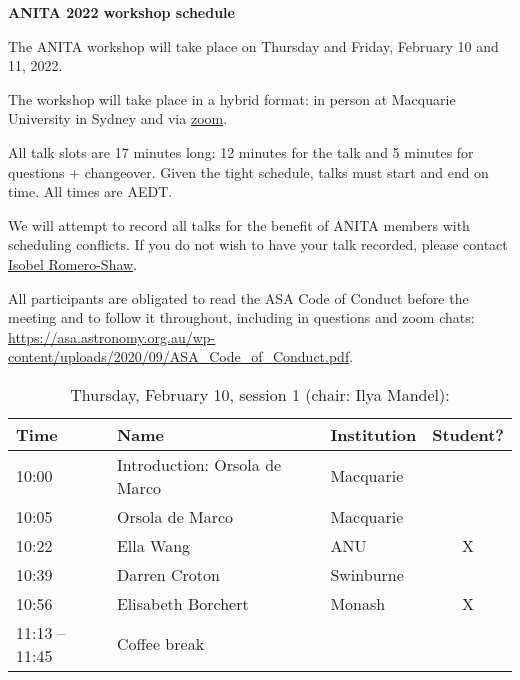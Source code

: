 \documentclass[amsmath,onecolumn]{revtex4-1}
\begin{document}
\begin{center}
{\bf ANITA 2022 workshop schedule}\\
\end{center}
\vspace{0.2in}

The ANITA workshop will take place on Thursday and Friday, February 10 and 11, 2022.

The workshop will take place in a hybrid format: in person at Macquarie University in Sydney and via \href{https://uni-sydney.zoom.us/j/83045235112}{zoom}.  %

All talk slots are 17 minutes long: 12 minutes for the talk and 5 minutes for questions + changeover.  Given the tight schedule, talks must start and end on time.  All times are AEDT.


We will attempt to record all talks for the benefit of ANITA members with scheduling conflicts.  If you do not wish to have your talk recorded, please contact \href{mailto:isobel.romero-shaw@monash.edu}{Isobel Romero-Shaw}.

All participants are obligated to read the ASA Code of Conduct before the meeting and to follow it throughout, including in questions and zoom chats:
\url{https://asa.astronomy.org.au/wp-content/uploads/2020/09/ASA_Code_of_Conduct.pdf}.

\FloatBarrier

\begin{table}[!htbp]
	\centering
	\caption{Thursday, February 10, session 1 (chair: Ilya Mandel):}
\begin{tabular}{| l | l | l | c |}
	\hline
	Time & Name  & Institution & Student? \\ 		
	\hline
	10:00 & Introduction: Orsola de Marco & Macquarie & \\
	10:05 & {Orsola de Marco} & Macquarie &  \\
	10:22 &  {Ella Wang} & ANU & X \\
	10:39 &  {Darren Croton} & Swinburne & \\
	10:56 & {Elisabeth Borchert} & Monash & X \\
	11:13 -- 11:45 & Coffee break & & \\
	\hline
\end{tabular}
\end{table}
\end{document}
